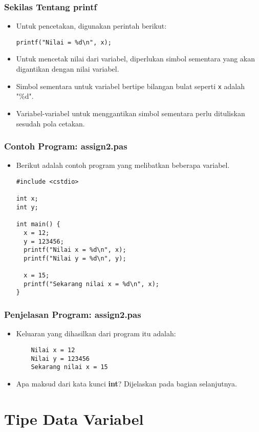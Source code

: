 \begin{frame}[fragile]
\frametitle{Sekilas Tentang printf}
\begin{itemize}
  \item Untuk pencetakan, digunakan perintah berikut:
\begin{lstlisting}
printf("Nilai = %d\n", x);
\end{lstlisting}
  \item Untuk mencetak nilai dari variabel, diperlukan simbol sementara yang akan digantikan dengan nilai variabel.
  \item Simbol sementara untuk variabel bertipe bilangan bulat seperti \texttt{x} adalah "\%d".
  \item Variabel-variabel untuk menggantikan simbol sementara perlu dituliskan sesudah pola cetakan.
\end{itemize}
\end{frame}

\begin{frame}[fragile]
\frametitle{Contoh Program: assign2.pas}
\begin{itemize}
  \item Berikut adalah contoh program yang melibatkan beberapa variabel.
\begin{lstlisting}
#include <cstdio>

int x;
int y;

int main() {
  x = 12;
  y = 123456;
  printf("Nilai x = %d\n", x);
  printf("Nilai y = %d\n", y);

  x = 15;
  printf("Sekarang nilai x = %d\n", x);
}
\end{lstlisting}
\end{itemize}
\end{frame}

\begin{frame}[fragile]
\frametitle{Penjelasan Program: assign2.pas}
\begin{itemize}
  \item Keluaran yang dihasilkan dari program itu adalah:
  \begin{lstlisting}
    Nilai x = 12
    Nilai y = 123456
    Sekarang nilai x = 15
  \end{lstlisting}
  \item Apa maksud dari kata kunci \textbf{int}? Dijelaskan pada bagian selanjutnya.
\end{itemize}
\end{frame}

\section{Tipe Data Variabel}
\frame{\sectionpage}

